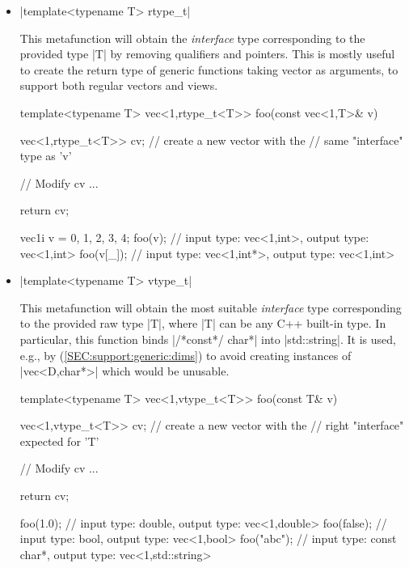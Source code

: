 \documentclass[12pt,a4paper]{report}
\newenvironment{example}
{
    \begin{mdframed}[style=example,frametitle={Example}]
}
{
    \end{mdframed}
}
\newcommand{\cppconst}{\cppinline{const}\xspace}
\begin{document}
\begin{itemize}
\item \cppinline|template<typename T> rtype_t|

This metafunction will obtain the \emph{interface} type corresponding to the provided type \cppinline|T| by removing \cppconst qualifiers and pointers. This is mostly useful to create the return type of generic functions taking vector as arguments, to support both regular vectors and views.

\begin{example}
\begin{cppcode}
template<typename T>
vec<1,rtype_t<T>> foo(const vec<1,T>& v) {
    vec<1,rtype_t<T>> cv; // create a new vector with the
                          // same "interface" type as 'v'

    // Modify cv ...

    return cv;
}

vec1i v = {0, 1, 2, 3, 4};
foo(v);    // input type: vec<1,int>,  output type: vec<1,int>
foo(v[_]); // input type: vec<1,int*>, output type: vec<1,int>
\end{cppcode}
\end{example}

\item \cppinline|template<typename T> vtype_t|

This metafunction will obtain the most suitable \emph{interface} type corresponding to the provided raw type \cppinline|T|, where \cppinline|T| can be any C++ built-in type. In particular, this function binds \cppinline|/*const*/ char*| into \cppinline|std::string|. It is used, e.g., by  (\ref{SEC:support:generic:dims}) to avoid creating instances of \cppinline|vec<D,char*>| which would be unusable.

\begin{example}
\begin{cppcode}
template<typename T>
vec<1,vtype_t<T>> foo(const T& v) {
    vec<1,vtype_t<T>> cv; // create a new vector with the
                          // right "interface" expected for 'T'

    // Modify cv ...

    return cv;
}

foo(1.0);   // input type: double,      output type: vec<1,double>
foo(false); // input type: bool,        output type: vec<1,bool>
foo("abc"); // input type: const char*, output type: vec<1,std::string>
\end{cppcode}
\end{example}


\end{itemize}
\end{document}
